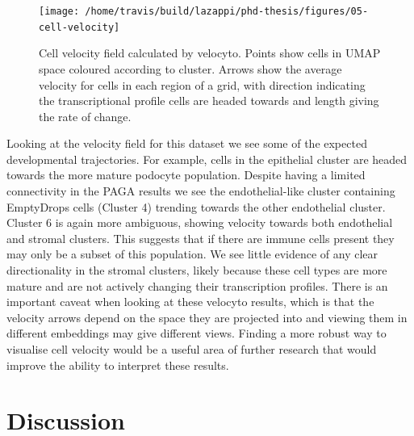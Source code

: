 \documentclass[11pt,a4paper,titlepage,twoside,openright]{style/unimelbthesis}
\theoremstyle{definition}
\theoremstyle{definition}
\theoremstyle{definition}
\theoremstyle{remark}
\begin{document}
\begin{mainmatter}
\begin{figure}

{\centering \texttt{[image: /home/travis/build/lazappi/phd-thesis/figures/05-cell-velocity]} 

}

\caption[Cell velocity field calculated by velocyto.]{Cell velocity field calculated by velocyto. Points show cells in UMAP space coloured according to cluster. Arrows show the average velocity for cells in each region of a grid, with direction indicating the transcriptional profile cells are headed towards and length giving the rate of change.}\label{fig:cell-velocity}
\end{figure}





Looking at the velocity field for this dataset we see some of the expected developmental trajectories. For example, cells in the epithelial cluster are headed towards the more mature podocyte population. Despite having a limited connectivity in the PAGA results we see the endothelial-like cluster containing EmptyDrops cells (Cluster 4) trending towards the other endothelial cluster. Cluster 6 is again more ambiguous, showing velocity towards both endothelial and stromal clusters. This suggests that if there are immune cells present they may only be a subset of this population. We see little evidence of any clear directionality in the stromal clusters, likely because these cell types are more mature and are not actively changing their transcription profiles. There is an important caveat when looking at these velocyto results, which is that the velocity arrows depend on the space they are projected into and viewing them in different embeddings may give different views. Finding a more robust way to visualise cell velocity would be a useful area of further research that would improve the ability to interpret these results.

\hypertarget{discussion}{%
\section{Discussion}\label{discussion}}


\end{mainmatter}
\end{document}
